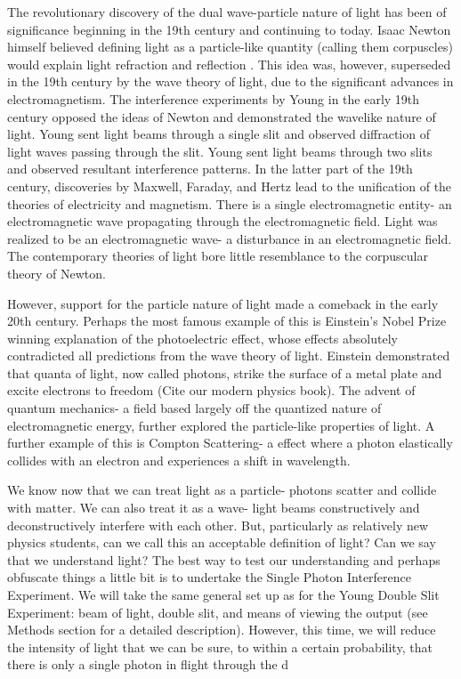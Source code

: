 \documentclass[prb,preprint]{revtex4-1}
\begin{document}
The revolutionary discovery of the dual wave-particle nature of light has been of significance beginning in the 19th century and continuing to today.  Isaac Newton himself believed defining light as a particle-like quantity (calling them corpuscles) would explain light refraction and reflection \cite{newton}.  This idea was, however, superseded in the 19th century by the wave theory of light, due to the significant advances in electromagnetism.  The interference experiments by Young in the early 19th century opposed the ideas of Newton and demonstrated the wavelike nature of light.  Young sent light beams through a single slit and observed diffraction of light waves passing through the slit.  Young sent light beams through two slits and observed resultant interference patterns.  In the latter part of the 19th century, discoveries by Maxwell, Faraday, and Hertz lead to the unification of the theories of electricity and magnetism.  There is a single electromagnetic entity- an electromagnetic wave propagating through the electromagnetic field.  Light was realized to be an electromagnetic wave- a disturbance in an electromagnetic field.  The contemporary theories of light bore little resemblance to the corpuscular theory of Newton.  \cite{david}

However, support for the particle nature of light made a comeback in the early 20th century.  Perhaps the most famous example of this is Einstein's Nobel Prize winning explanation of the photoelectric effect, whose effects absolutely contradicted all predictions from the wave theory of light.  Einstein demonstrated that quanta of light, now called photons, strike the surface of a metal plate and excite electrons to freedom (Cite our modern physics book).  The advent of quantum mechanics- a field based largely off the quantized nature of electromagnetic energy, further explored the particle-like properties of light.  A further example of this is Compton Scattering- a effect where a photon elastically collides with an electron and experiences a shift in wavelength.  

We know now that we can treat light as a particle- photons scatter and collide with matter.  We can also treat it as a wave- light beams constructively and deconstructively interfere with each other.  But, particularly as relatively new physics students, can we call this an acceptable definition of light?  Can we say that we understand light?  The best way to test our understanding and perhaps obfuscate things a little bit is to undertake the Single Photon Interference Experiment.  We will take the same general set up as for the Young Double Slit Experiment:  beam of light, double slit, and means of viewing the output (see Methods section for a detailed description).  However, this time, we will reduce the intensity of light that we can be sure, to within a certain probability, that there is only a single photon in flight through the d
\end{document}
